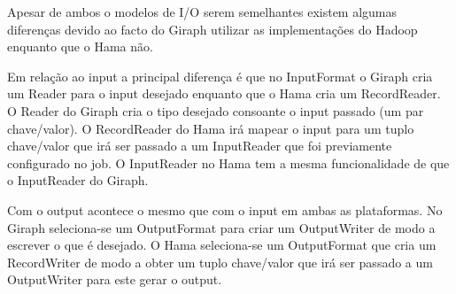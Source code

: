 Apesar de ambos o modelos de I/O serem semelhantes existem algumas diferenças devido ao facto do Giraph utilizar as implementações 
do Hadoop enquanto que o Hama não. 

Em relação ao input a principal diferença é que no InputFormat o Giraph cria um Reader para o input desejado enquanto que 
o Hama cria um RecordReader. O Reader do Giraph cria o tipo desejado consoante o input passado (um par chave/valor). O RecordReader
do Hama irá mapear o input para um tuplo chave/valor que irá ser passado a um InputReader que foi previamente configurado no job. O InputReader
no Hama tem a mesma funcionalidade de que o InputReader do Giraph.

Com o output acontece o mesmo que com o input em ambas as plataformas. No Giraph seleciona-se um OutputFormat para criar um OutputWriter de modo
a escrever o que é desejado. O Hama seleciona-se um OutputFormat que cria um RecordWriter de modo a obter um tuplo chave/valor que irá ser
passado a um OutputWriter para este gerar o output.